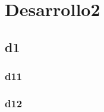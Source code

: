 \chapter{Desarrollo2}
\thispagestyle{empty}

\section{d1}

\subsection{d11}


\newpage
\subsection{d12}